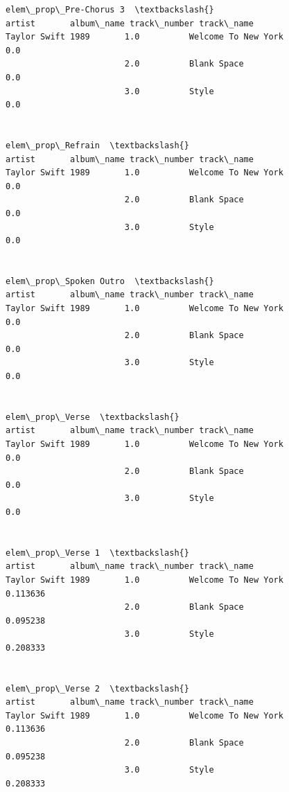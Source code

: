 \documentclass[11pt]{article}
\begin{document}
\begin{Verbatim}[commandchars=\\\{\}]
                                                          elem\_prop\_Pre-Chorus 3  \textbackslash{}
artist       album\_name track\_number track\_name                                    
Taylor Swift 1989       1.0          Welcome To New York                     0.0   
                        2.0          Blank Space                             0.0   
                        3.0          Style                                   0.0   

                                                          elem\_prop\_Refrain  \textbackslash{}
artist       album\_name track\_number track\_name                               
Taylor Swift 1989       1.0          Welcome To New York                0.0   
                        2.0          Blank Space                        0.0   
                        3.0          Style                              0.0   

                                                          elem\_prop\_Spoken Outro  \textbackslash{}
artist       album\_name track\_number track\_name                                    
Taylor Swift 1989       1.0          Welcome To New York                     0.0   
                        2.0          Blank Space                             0.0   
                        3.0          Style                                   0.0   

                                                          elem\_prop\_Verse  \textbackslash{}
artist       album\_name track\_number track\_name                             
Taylor Swift 1989       1.0          Welcome To New York              0.0   
                        2.0          Blank Space                      0.0   
                        3.0          Style                            0.0   

                                                          elem\_prop\_Verse 1  \textbackslash{}
artist       album\_name track\_number track\_name                               
Taylor Swift 1989       1.0          Welcome To New York           0.113636   
                        2.0          Blank Space                   0.095238   
                        3.0          Style                         0.208333   

                                                          elem\_prop\_Verse 2  \textbackslash{}
artist       album\_name track\_number track\_name                               
Taylor Swift 1989       1.0          Welcome To New York           0.113636   
                        2.0          Blank Space                   0.095238   
                        3.0          Style                         0.208333   


\end{Verbatim}
\end{document}
